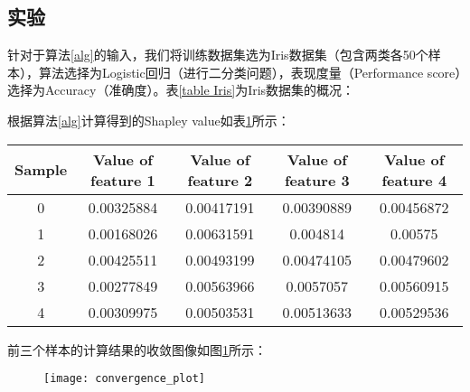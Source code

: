 \subsection{实验}
针对于算法\ref{alg}的输入，我们将训练数据集选为Iris数据集（包含两类各50个样本），算法选择为Logistic回归（进行二分类问题），表现度量（Performance score）选择为Accuracy（准确度）。表\ref{table Iris}为Iris数据集的概况：
\begin{table}[H]\small
	\centering
	\label{table Iris}
	
\end{table}
根据算法\ref{alg}计算得到的Shapley value如表\ref{table value}所示：
\begin{table}[H]\small
	\centering
	\label{table value}
	\begin{tabular}{ccccc}
		\toprule[1.5pt]
		\textbf{Sample} & \textbf{Value of feature 1} & \textbf{Value of feature 2} & \textbf{Value of feature 3} 
		& \textbf{Value of feature 4} \\
		\midrule[1pt]
		0&0.00325884 & 0.00417191 & 0.00390889 & 0.00456872 \\
		1&0.00168026 & 0.00631591 & 0.004814   & 0.00575  \\
		2&0.00425511 & 0.00493199 & 0.00474105 & 0.00479602 \\
		3&0.00277849 & 0.00563966 & 0.0057057  & 0.00560915 \\
		4& 0.00309975 & 0.00503531 & 0.00513633 & 0.00529536 \\
		\bottomrule[1.5pt]
	\end{tabular}
	
\end{table}
前三个样本的计算结果的收敛图像如图\ref{fig:convergence}所示：
\begin{figure}[H]
	\centering
	\texttt{[image: convergence\_plot]} %
	\label{fig:convergence}
\end{figure}
